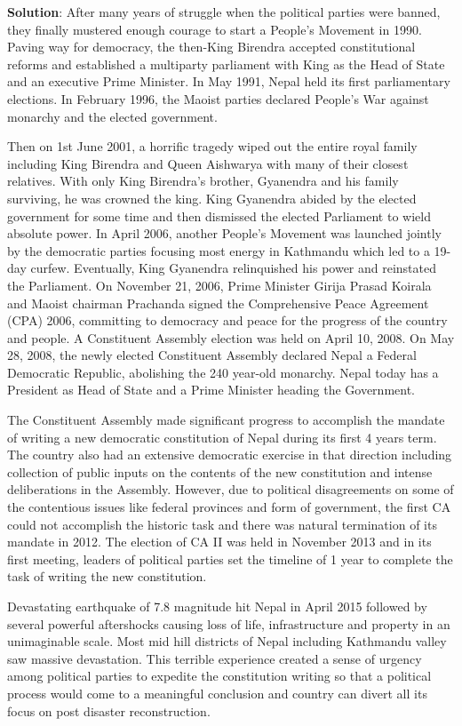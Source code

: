 \documentclass[
]{book}
\newenvironment{solution}{ {\bfseries Solution}:}{}
\begin{document}
\begin{questions}
\begin{solution}
After many years of struggle when the political parties were banned, they finally mustered enough courage to start a People’s Movement in 1990. Paving way for democracy, the then-King Birendra accepted constitutional reforms and established a multiparty parliament with King as the Head of State and an executive Prime Minister. In May 1991, Nepal held its first parliamentary elections. In February 1996, the Maoist parties declared People’s War against monarchy and the elected government.

Then on 1st June 2001, a horrific tragedy wiped out the entire royal family including King Birendra and Queen Aishwarya with many of their closest relatives. With only King Birendra’s brother, Gyanendra and his family surviving, he was crowned the king. King Gyanendra abided by the elected government for some time and then dismissed the elected Parliament to wield absolute power. In April 2006, another People’s Movement was launched jointly by the democratic parties focusing most energy in Kathmandu which led to a 19-day curfew. Eventually, King Gyanendra relinquished his power and reinstated the Parliament. On November 21, 2006, Prime Minister Girija Prasad Koirala and Maoist chairman Prachanda signed the Comprehensive Peace Agreement (CPA) 2006, committing to democracy and peace for the progress of the country and people. A Constituent Assembly election was held on April 10, 2008. On May 28, 2008, the newly elected Constituent Assembly declared Nepal a Federal Democratic Republic, abolishing the 240 year-old monarchy. Nepal today has a President as Head of State and a Prime Minister heading the Government.

The Constituent Assembly made significant progress to accomplish the mandate of writing a new democratic constitution of Nepal during its first 4 years term. The country also had an extensive democratic exercise in that direction including collection of public inputs on the contents of the new constitution and intense deliberations in the Assembly. However, due to political disagreements on some of the contentious issues like federal provinces and form of government, the first CA could not accomplish the historic task and there was natural termination of its mandate in 2012. The election of CA II was held in November 2013 and in its first meeting, leaders of political parties set the timeline of 1 year to complete the task of writing the new constitution.

Devastating earthquake of 7.8 magnitude hit Nepal in April 2015 followed by several powerful aftershocks causing loss of life, infrastructure and property in an unimaginable scale. Most mid hill districts of Nepal including Kathmandu valley saw massive devastation. This terrible experience created a sense of urgency among political parties to expedite the constitution writing so that a political process would come to a meaningful conclusion and country can divert all its focus on post disaster reconstruction.


\end{solution}
\end{questions}
\end{document}
